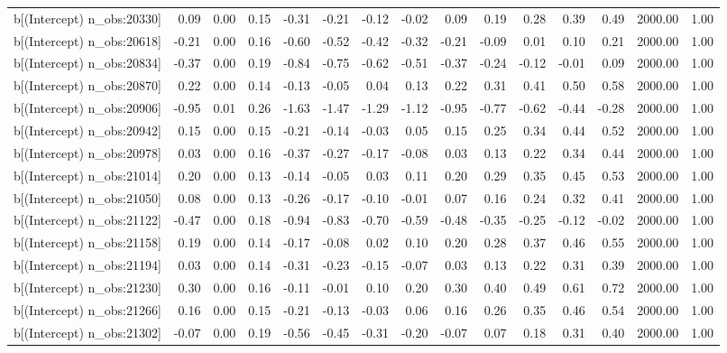 \begin{table}[ht]
\begin{tabular}{rrrrrrrrrrrrrrr}
  b[(Intercept) n\_obs:20330] & 0.09 & 0.00 & 0.15 & -0.31 & -0.21 & -0.12 & -0.02 & 0.09 & 0.19 & 0.28 & 0.39 & 0.49 & 2000.00 & 1.00 \\ 
  b[(Intercept) n\_obs:20618] & -0.21 & 0.00 & 0.16 & -0.60 & -0.52 & -0.42 & -0.32 & -0.21 & -0.09 & 0.01 & 0.10 & 0.21 & 2000.00 & 1.00 \\ 
  b[(Intercept) n\_obs:20834] & -0.37 & 0.00 & 0.19 & -0.84 & -0.75 & -0.62 & -0.51 & -0.37 & -0.24 & -0.12 & -0.01 & 0.09 & 2000.00 & 1.00 \\ 
  b[(Intercept) n\_obs:20870] & 0.22 & 0.00 & 0.14 & -0.13 & -0.05 & 0.04 & 0.13 & 0.22 & 0.31 & 0.41 & 0.50 & 0.58 & 2000.00 & 1.00 \\ 
  b[(Intercept) n\_obs:20906] & -0.95 & 0.01 & 0.26 & -1.63 & -1.47 & -1.29 & -1.12 & -0.95 & -0.77 & -0.62 & -0.44 & -0.28 & 2000.00 & 1.00 \\ 
  b[(Intercept) n\_obs:20942] & 0.15 & 0.00 & 0.15 & -0.21 & -0.14 & -0.03 & 0.05 & 0.15 & 0.25 & 0.34 & 0.44 & 0.52 & 2000.00 & 1.00 \\ 
  b[(Intercept) n\_obs:20978] & 0.03 & 0.00 & 0.16 & -0.37 & -0.27 & -0.17 & -0.08 & 0.03 & 0.13 & 0.22 & 0.34 & 0.44 & 2000.00 & 1.00 \\ 
  b[(Intercept) n\_obs:21014] & 0.20 & 0.00 & 0.13 & -0.14 & -0.05 & 0.03 & 0.11 & 0.20 & 0.29 & 0.35 & 0.45 & 0.53 & 2000.00 & 1.00 \\ 
  b[(Intercept) n\_obs:21050] & 0.08 & 0.00 & 0.13 & -0.26 & -0.17 & -0.10 & -0.01 & 0.07 & 0.16 & 0.24 & 0.32 & 0.41 & 2000.00 & 1.00 \\ 
  b[(Intercept) n\_obs:21122] & -0.47 & 0.00 & 0.18 & -0.94 & -0.83 & -0.70 & -0.59 & -0.48 & -0.35 & -0.25 & -0.12 & -0.02 & 2000.00 & 1.00 \\ 
  b[(Intercept) n\_obs:21158] & 0.19 & 0.00 & 0.14 & -0.17 & -0.08 & 0.02 & 0.10 & 0.20 & 0.28 & 0.37 & 0.46 & 0.55 & 2000.00 & 1.00 \\ 
  b[(Intercept) n\_obs:21194] & 0.03 & 0.00 & 0.14 & -0.31 & -0.23 & -0.15 & -0.07 & 0.03 & 0.13 & 0.22 & 0.31 & 0.39 & 2000.00 & 1.00 \\ 
  b[(Intercept) n\_obs:21230] & 0.30 & 0.00 & 0.16 & -0.11 & -0.01 & 0.10 & 0.20 & 0.30 & 0.40 & 0.49 & 0.61 & 0.72 & 2000.00 & 1.00 \\ 
  b[(Intercept) n\_obs:21266] & 0.16 & 0.00 & 0.15 & -0.21 & -0.13 & -0.03 & 0.06 & 0.16 & 0.26 & 0.35 & 0.46 & 0.54 & 2000.00 & 1.00 \\ 
  b[(Intercept) n\_obs:21302] & -0.07 & 0.00 & 0.19 & -0.56 & -0.45 & -0.31 & -0.20 & -0.07 & 0.07 & 0.18 & 0.31 & 0.40 & 2000.00 & 1.00 \\ 

\end{tabular}
\end{table}
